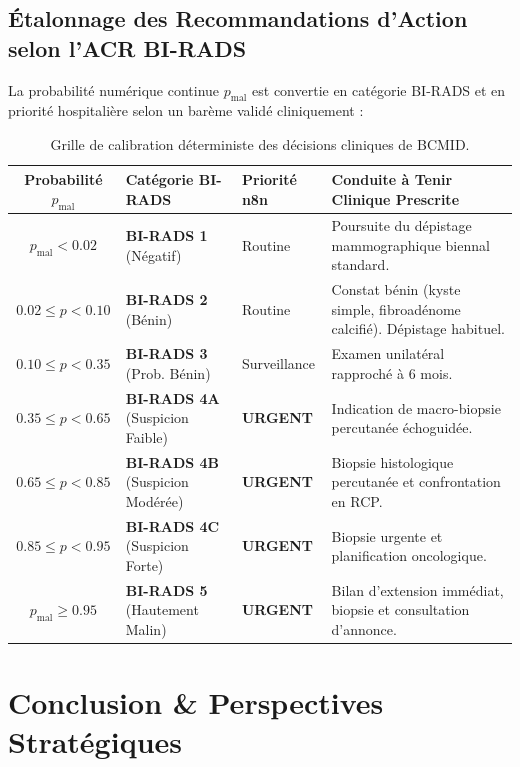 \documentclass[11pt,a4paper]{article}
\begin{document}
\subsection{Étalonnage des Recommandations d'Action selon l'ACR BI-RADS}
La probabilit\'e num\'erique continue $p_{\text{mal}}$ est convertie en cat\'egorie BI-RADS et en priorit\'e hospitali\`ere selon un bar\`eme valid\'e cliniquement :

\begin{table}[htbp]
\centering
\small
\renewcommand{\arraystretch}{1.25}
\caption{Grille de calibration déterministe des décisions cliniques de BCMID.}
\label{tab:birads_calibration}
\begin{tabularx}{\linewidth}{|c|l|l|X|}
\hline
\rowcolor{LightBlueBg}
\textbf{Probabilité $p_{\text{mal}}$} & \textbf{Catégorie BI-RADS} & \textbf{Priorité n8n} & \textbf{Conduite à Tenir Clinique Prescrite} \\
\hline
$p_{\text{mal}} < 0.02$ & \textbf{BI-RADS 1} (Négatif) & Routine & Poursuite du dépistage mammographique biennal standard. \\
\hline
$0.02 \le p < 0.10$ & \textbf{BI-RADS 2} (Bénin) & Routine & Constat bénin (kyste simple, fibroadénome calcifié). Dépistage habituel. \\
\hline
$0.10 \le p < 0.35$ & \textbf{BI-RADS 3} (Prob. Bénin) & Surveillance & Examen unilatéral rapproché à 6 mois. \\
\hline
$0.35 \le p < 0.65$ & \textbf{BI-RADS 4A} (Suspicion Faible) & \textbf{URGENT} & Indication de macro-biopsie percutanée échoguidée. \\
\hline
$0.65 \le p < 0.85$ & \textbf{BI-RADS 4B} (Suspicion Modérée) & \textbf{URGENT} & Biopsie histologique percutanée et confrontation en RCP. \\
\hline
$0.85 \le p < 0.95$ & \textbf{BI-RADS 4C} (Suspicion Forte) & \textbf{URGENT} & Biopsie urgente et planification oncologique. \\
\hline
$p_{\text{mal}} \ge 0.95$ & \textbf{BI-RADS 5} (Hautement Malin) & \textbf{URGENT} & Bilan d'extension immédiat, biopsie et consultation d'annonce. \\
\hline
\end{tabularx}
\end{table}

\section{Conclusion \& Perspectives Stratégiques}
\label{sec:conclusion}
\end{document}
